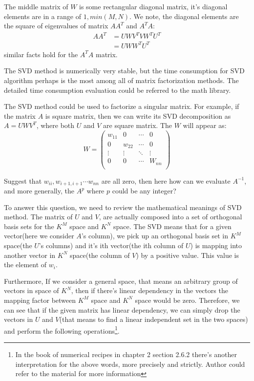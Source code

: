 The middle matrix of $W$ is some rectangular diagonal matrix,
it's diagonal elements are in a range of $1,min(M,N)$.
We note, the diagonal elements
are the square of eigenvalues of matrix $AA^{T}$ and $A^{T}A$:
\begin{align}
 \label{Solution_Linear_Equations_eq:8}
 AA^{T} &= UWV^{T}VW^{T}U^{T} \nonumber \\
        &= UWW^{T}U^{T}   
\end{align}
similar facts hold for the $A^{T}A$ matrix.

The SVD method is numerically very stable, but the time consumption
for SVD algorithm perhaps is the most among all of matrix factorization
methods. The detailed time consumption evaluation could be referred to
the math library.

The SVD method could be used to factorize a singular matrix. For example,
if the matrix $A$ is square matrix, then we can write its SVD decomposition
as $A = UWV^{T}$, where both $U$ and $V$ are square matrix. The $W$ will appear
as:
\begin{equation}
 \label{Solution_Linear_Equations_eq:9}
 W = 
 \begin{pmatrix}
w_{11}  &  0       & \cdots  & 0      \\ 
0       &  w_{22}  & \cdots  & 0      \\ 
\vdots  &  \vdots  & \ddots  & \vdots \\ 
0       &  0       & \cdots  & W_{nn} \\ 
\end{pmatrix}
\end{equation}

Suggest that $w_{ii}, w_{i+1,i+1} \cdots w_{nn}$ are all zero, then here
how can we evaluate $A^{-1}$, and more generally, the $A^{p}$ where $p$
could be any integer?

To answer this question, we need to review the mathematical meanings of SVD
method. The matrix of $U$ and $V$, are actually composed into a set of 
orthogonal basis sets for the $K^{M}$ space and $K^{N}$ space. The SVD
means that for a given vector(here we consider $A$'s column),
we pick up an orthogonal basis set in $K^{M}$ space(the $U$'s columns) 
and it's ith vector(the ith column of $U$) is mapping into another vector
in $K^{N}$ space(the column of $V$) by a positive value. This value is the element
of $w_{i}$. 

Furthermore, If we consider a general space, that means an arbitrary group of 
vectors in space of $K^{N}$, then if there's linear dependency in the vectors
the mapping factor between $K^{M}$ space and $K^{N}$ space would be zero. Therefore,
we can see that if the given matrix has linear dependency, we can simply drop the 
vectors in $U$ and $V$(that means to find a linear independent set in the two spaces)
and perform the following operations\footnote{In the book of numerical recipes in 
chapter 2 section 2.6.2 there's another interpretation for the above words, more precisely
and strictly. Author could refer to the material for more information}.


